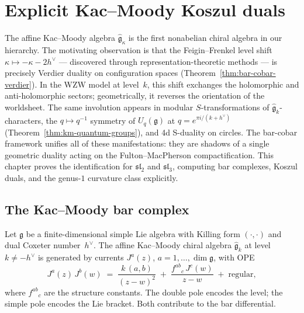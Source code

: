 \chapter{Explicit Kac--Moody Koszul duals}\label{chap:kac-moody-koszul}
\label{chap:kac-moody}

The affine Kac--Moody algebra $\widehat{\mathfrak{g}}_\kappa$ is the
first nonabelian chiral algebra in our hierarchy.  The motivating
observation is that the Feigin--Frenkel level shift
$\kappa \mapsto -\kappa - 2h^\vee$ --- discovered through
representation-theoretic methods --- is precisely Verdier duality on
configuration spaces
(Theorem~\ref{thm:bar-cobar-verdier}).
In the WZW model at level~$k$, this shift exchanges the holomorphic
and anti-holomorphic sectors; geometrically, it reverses the
orientation of the worldsheet.  The same involution appears in modular
$S$-transformations of $\widehat{\mathfrak{g}}_k$-characters, the
$q \mapsto q^{-1}$ symmetry of $U_q(\mathfrak{g})$ at
$q = e^{\pi i/(k+h^\vee)}$
(Theorem~\ref{thm:km-quantum-groups}), and 4d S-duality on circles.
The bar-cobar framework unifies all of these manifestations: they are
shadows of a single geometric duality acting on the Fulton--MacPherson
compactification.  This chapter proves the identification for
$\mathfrak{sl}_2$ and $\mathfrak{sl}_3$, computing bar complexes,
Koszul duals, and the genus-$1$ curvature class explicitly.

\section{The Kac--Moody bar complex}%
\label{sec:km-bar-complex}

Let $\mathfrak{g}$ be a finite-dimensional simple Lie algebra with
Killing form $(\cdot,\cdot)$ and dual Coxeter number~$h^\vee$.
The affine Kac--Moody chiral algebra $\widehat{\mathfrak{g}}_k$
at level $k \neq -h^\vee$ is generated by currents
$J^a(z)$, $a = 1, \ldots, \dim \mathfrak{g}$, with OPE
\[
  J^a(z)\,J^b(w) \;=\; \frac{k\,(a,b)}{(z-w)^2}
  \;+\; \frac{f^{ab}{}_c \, J^c(w)}{z-w}
  \;+\; \text{regular},
\]
where $f^{ab}{}_c$ are the structure constants.  The double pole
encodes the level; the simple pole encodes the Lie bracket.  Both
contribute to the bar differential.

